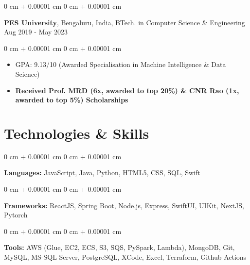 \documentclass[10pt, a4paper]{article}
\newenvironment{highlights}{
    \begin{itemize}[
        topsep=0 cm,
        parsep=0 cm,
        partopsep=0pt,
        itemsep=0pt,
        leftmargin=0 cm + 10pt
    ]
}{
    \end{itemize}
} %
\newenvironment{onecolentry}{
    \begin{adjustwidth}{
        0 cm + 0.00001 cm
    }{
        0 cm + 0.00001 cm
    }
}{
    \end{adjustwidth}
} %
\newenvironment{twocolentry}[2][]{
    \onecolentry
    \def\secondColumn{#2}
    \setcolumnwidth{\fill, 6.0 cm}
    \begin{paracol}{2}
}{
    \switchcolumn \raggedleft \secondColumn
    \end{paracol}
    \endonecolentry
} %
\begin{document}
        \vspace{0.10 cm}
        \begin{twocolentry}{
            Aug 2019 - May 2023
        }
            \textbf{PES University}, Bengaluru, India, BTech. in Computer Science \& Engineering\end{twocolentry}

        \vspace{0.10 cm}
        \begin{onecolentry}
            \begin{highlights}
                \item GPA: 9.13/10 (Awarded Specialisation in Machine Intelligence \& Data Science)
                \item \textbf{Received Prof. MRD (6x, awarded to top 20\%) \& CNR Rao (1x, awarded to top 5\%) Scholarships}
            \end{highlights}
        \end{onecolentry}

    \section{Technologies \& Skills}
        \begin{onecolentry}
            \textbf{Languages:} JavaScript, Java, Python, HTML5, CSS, SQL, Swift 
        \end{onecolentry}
        \begin{onecolentry}
            \textbf{Frameworks:} ReactJS, Spring Boot, Node.js, Express, SwiftUI, UIKit, NextJS, Pytorch
        \end{onecolentry}
        \begin{onecolentry}
            \textbf{Tools:} AWS (Glue, EC2, ECS, S3, SQS, PySpark, Lambda), MongoDB, Git, MySQL, MS-SQL Server, PostgreSQL, XCode, Excel, Terraform, Github Actions
        \end{onecolentry}
\end{document}
